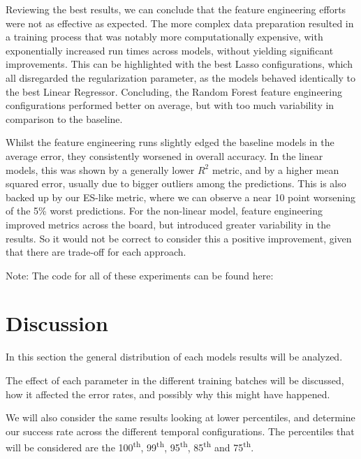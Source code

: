 \documentclass[12pt]{report} %
\begin{document}
Reviewing the best results, we can conclude that the feature engineering efforts were not as effective as expected. The more complex data preparation resulted in a training process that was notably more computationally expensive, with exponentially increased run times across models, without yielding significant improvements. This can be highlighted with the best Lasso configurations, which all disregarded the regularization parameter, as the models behaved identically to the best Linear Regressor. Concluding, the Random Forest feature engineering configurations performed better on average, but with too much variability in comparison to the baseline.

Whilst the feature engineering runs slightly edged the baseline models in the average error, they consistently worsened in overall accuracy. In the linear models, this was shown by a generally lower $R^2$ metric, and by a higher mean squared error, usually due to bigger outliers among the predictions. This is also backed up by our ES-like metric, where we can observe a near 10 point worsening of the 5\% worst predictions. For the non-linear model, feature engineering improved metrics across the board, but introduced greater variability in the results. So it would not be correct to consider this a positive improvement, given that there are trade-off for each approach.

Note: The code for all of these experiments can be found here:


\section{Discussion} %

In this section the general distribution of each models results will be analyzed. 

The effect of each parameter in the different training batches will be discussed, how it affected the error rates, and possibly why this might have happened.

We will also consider the same results looking at lower percentiles, and determine our success rate across the different temporal configurations. The percentiles that will be considered are the 100\textsuperscript{th}, 99\textsuperscript{th}, 95\textsuperscript{th}, 85\textsuperscript{th} and 75\textsuperscript{th}.
\end{document}

